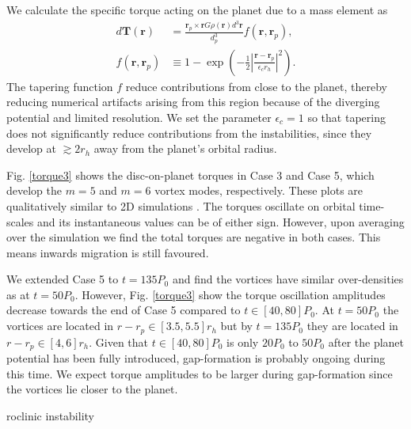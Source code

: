 We calculate the specific torque acting on the planet due to a mass
element as 
\begin{align}
d\bm{T}(\bm{r}) &=
\frac{\bm{r}_p\times\bm{r}G\rho(\bm{r})d^3\bm{r}}{d_p^3}f(\bm{r},\bm{r}_p),\\
f(\bm{r},\bm{r}_p)&\equiv 1
-\exp{\left(-\frac{1}{2}\left|\frac{\bm{r}-\bm{r}_p}{\epsilon_c
      r_h}\right|^2\right)}.  
\end{align} 
The tapering function $f$ reduce contributions from close to the
planet, thereby reducing numerical artifacts arising from this region
because of the diverging potential and limited resolution. We set  
the parameter $\epsilon_c=1$ so that tapering does not significantly
reduce contributions from the instabilities, since they develop
at $\gtrsim 2r_h$ away from the planet's orbital radius.  

Fig. \ref{torque3} shows the disc-on-planet torques in Case 3 and Case 5, which develop
the $m=5$ and $m=6$ vortex modes, respectively. These plots are qualitatively similar to
2D simulations \citep[e.g.][]{li05}. The torques oscillate on orbital 
time-scales and its instantaneous values can be of either sign. However, 
upon averaging over the simulation we find the total torques are negative in both cases. This
means inwards migration is still favoured. 

We extended Case 5 to $t=135P_0$ and find the vortices 
have similar over-densities as at $t=50P_0$. However, 
Fig. \ref{torque3} show the torque oscillation amplitudes decrease
towards the end of Case 5 compared to $t\in[40,80]P_0$.  
At $t=50P_0$ the vortices are located in $r-r_p\in[3.5,5.5]r_h$ but by
$t=135P_0$ they are located in $r-r_p\in[4,6]r_h$. 
Given that $t\in[40,80]P_0$ is only $20P_0$ to $50P_0$ after the planet  
potential has been fully introduced, gap-formation is probably 
ongoing during this time. We expect torque amplitudes to be larger
during  gap-formation since the vortices lie closer to the planet. 


roclinic instability
 
